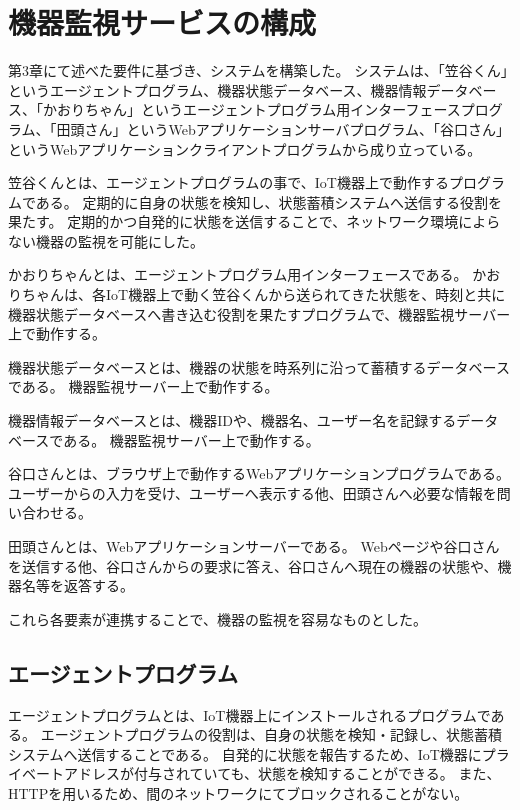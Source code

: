 \section{機器監視サービスの構成}
第3章にて述べた要件に基づき、システムを構築した。
システムは、「笠谷くん」というエージェントプログラム、機器状態データベース、機器情報データベース、「かおりちゃん」というエージェントプログラム用インターフェースプログラム、「田頭さん」というWebアプリケーションサーバプログラム、「谷口さん」というWebアプリケーションクライアントプログラムから成り立っている。
\medskip

笠谷くんとは、エージェントプログラムの事で、IoT機器上で動作するプログラムである。
定期的に自身の状態を検知し、状態蓄積システムへ送信する役割を果たす。
定期的かつ自発的に状態を送信することで、ネットワーク環境によらない機器の監視を可能にした。
\medskip

かおりちゃんとは、エージェントプログラム用インターフェースである。
かおりちゃんは、各IoT機器上で動く笠谷くんから送られてきた状態を、時刻と共に機器状態データベースへ書き込む役割を果たすプログラムで、機器監視サーバー上で動作する。
\medskip

機器状態データベースとは、機器の状態を時系列に沿って蓄積するデータベースである。
機器監視サーバー上で動作する。
\medskip

機器情報データベースとは、機器IDや、機器名、ユーザー名を記録するデータベースである。
機器監視サーバー上で動作する。
\medskip

谷口さんとは、ブラウザ上で動作するWebアプリケーションプログラムである。
ユーザーからの入力を受け、ユーザーへ表示する他、田頭さんへ必要な情報を問い合わせる。
\medskip

田頭さんとは、Webアプリケーションサーバーである。
Webページや谷口さんを送信する他、谷口さんからの要求に答え、谷口さんへ現在の機器の状態や、機器名等を返答する。

\medskip

これら各要素が連携することで、機器の監視を容易なものとした。

\subsection{エージェントプログラム}
エージェントプログラムとは、IoT機器上にインストールされるプログラムである。
エージェントプログラムの役割は、自身の状態を検知・記録し、状態蓄積システムへ送信することである。
自発的に状態を報告するため、IoT機器にプライベートアドレスが付与されていても、状態を検知することができる。
また、HTTPを用いるため、間のネットワークにてブロックされることがない。

